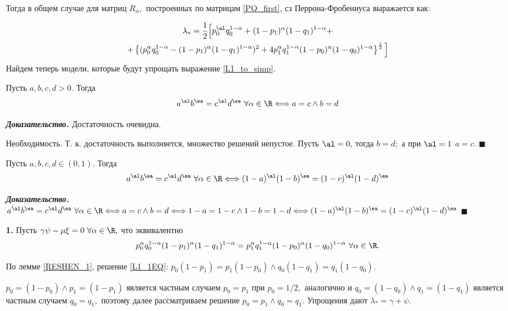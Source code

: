Тогда в общем случае для матриц $R_\alpha,$ построенных по матрицам \eqref{PQ_first}, сз Перрона-Фробениуса выражается как:

\begin{multline}
\label{L1}
\lambda_\ast = \frac{1}{2}
\Big[ p_0^\al q_0^{1-\alpha} + (1 - p_1)^\alpha (1 - q_1)^{1 - \alpha} + \\
+ \left\lbrace (p_0^\alpha q_0^{1-\alpha} - (1 - p_1)^\alpha (1 - q_1)^{1 - \alpha})^2 + 4 p_1^\alpha q_1^{1-\alpha} (1 - p_0)^\alpha (1 - q_0)^{1 - \alpha}   \right\rbrace^\frac{1}{2} \Big]
\end{multline}
Найдем теперь модели, которые будут упрощать выражение \eqref{L1_to_simp}.

\begin{lem}
\label{RESHEN_1}
Пусть $a, b, c, d > 0$. Тогда
$$a^\al b^\ea = c^\al d^\ea \ \forall \alpha \in \R \Longleftrightarrow a = c \wedge b = d$$
\end{lem}

{\bf\it Доказательство.} Достаточность очевидна. 

Необходимость. Т. к. достаточность выполняется, множество решений непустое. Пусть  $\al = 0,$ тогда $b = d;$ а при $\al = 1$ $a = c.$ $\blacksquare$

\begin{lem}
\label{RESHEN_2}
Пусть $a, b, c, d \in (0, 1)$. Тогда
$$a^\al b^\ea = c^\al d^\ea \ \forall \alpha \in \R \Longleftrightarrow (1 - a)^\al (1 - b)^\ea = (1 - c)^\al (1-d)^\ea$$
\end{lem}
{\bf\it Доказательство.} $a^\al b^\ea = c^\al d^\ea \ \forall \alpha \in \R \Longleftrightarrow a = c \wedge b = d \Longleftrightarrow 1 - a = 1 - c \wedge 1-b = 1- d \Longleftrightarrow (1 - a)^\al (1 - b)^\ea = (1 - c)^\al (1-d)^\ea$ $\blacksquare$

{\bf 1.} Пусть $\gamma \psi - \mu \xi = 0 \ \forall \alpha \in \R,$ что эквивалентно
\begin{equation}
\label{L1_1EQ}
p_0^\alpha q_0^{1-\alpha} (1 - p_1)^\alpha (1 - q_1)^{1 - \alpha} =  p_1^\alpha q_1^{1-\alpha} (1 - p_0)^\alpha (1 - q_0)^{1 - \alpha} \ \forall \alpha \in \R.
\end{equation} 

По лемме \ref{RESHEN_1}, решение \eqref{L1_1EQ}: $p_0(1-p_1) = p_1(1-p_0) \wedge q_0(1-q_1) = q_1(1-q_0).$ 

$p_0 = (1 - p_0) \wedge p_1 = (1 - p_1)$ является частным случаем $p_0 = p_1$ при $p_0 = 1/2,$ аналогично и $q_0 = (1 - q_0) \wedge q_1 = (1 - q_1)$ является частным случаем $q_0 = q_1,$ поэтому далее рассматриваем решение $p_0 = p_1 \wedge q_0 = q_1.$ Упрощения дают $\lambda_\ast = \gamma + \psi.$

